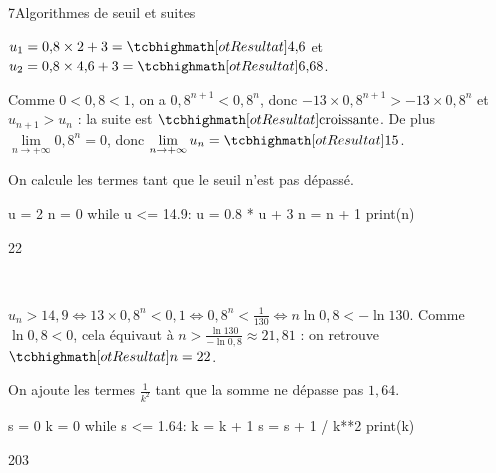 \begin{corrige}{7}{Algorithmes de seuil et suites}
\begin{questions}
  \item $u_1=0{,}8\times2+3=\res{4{,}6}$ et $u_2=0{,}8\times4{,}6+3=\res{6{,}68}$.
  \item Comme $0<0{,}8<1$, on a $0{,}8^{n+1}<0{,}8^{n}$, donc $-13\times0{,}8^{n+1}>-13\times0{,}8^{n}$ et $u_{n+1}>u_n$ : la suite est
    $\res{\text{croissante}}$. De plus $\lim\limits_{n\to+\infty}0{,}8^{n}=0$, donc $\lim\limits_{n\to+\infty}u_n=\res{15}$.
  \item On calcule les termes tant que le seuil n'est pas dépassé.
\begin{codecote}[0.42]
\begin{pythoncol}
u = 2
n = 0
while u <= 14.9:
    u = 0.8 * u + 3
    n = n + 1
print(n)
\end{pythoncol}

\smallskip
\begin{consolecol}
22
\end{consolecol}
\cote
\centering
{}\\[0.5mm]
\end{codecote}
  \item $u_n>14{,}9\iff13\times0{,}8^{n}<0{,}1\iff0{,}8^{n}<\frac1{130}\iff n\ln0{,}8<-\ln130$. Comme $\ln0{,}8<0$, cela équivaut à
    $n>\frac{\ln130}{-\ln0{,}8}\approx21{,}81$ : on retrouve $\res{n=22}$.
\end{questions}
\begin{questions}[resume]
  \item On ajoute les termes $\frac1{k^{2}}$ tant que la somme ne dépasse pas $1{,}64$.
\begin{codecote}[0.42]
\begin{pythoncol}
s = 0
k = 0
while s <= 1.64:
    k = k + 1
    s = s + 1 / k**2
print(k)
\end{pythoncol}
\cote
\begin{consolecol}
203
\end{consolecol}


\end{codecote}
\end{questions}
\end{corrige}
